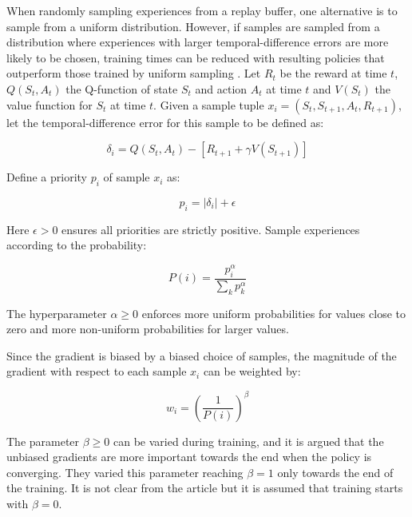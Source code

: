 When randomly sampling experiences from a replay buffer, one alternative is to
sample from a uniform distribution. However, if samples are sampled from a
distribution where experiences with larger temporal-difference errors are more
likely to be chosen, training times can be reduced with resulting policies that
outperform those trained by uniform sampling \cite{schaul2015prioritized}. Let
$R_{t}$ be the reward at time $t$, $Q(S_t, A_t)$ the Q-function of state $S_t$
and action $A_t$ at time $t$ and $V(S_t)$ the value function for $S_t$ at time
$t$. Given a sample tuple $x_i = (S_t, S_{t+1}, A_t, R_{t+1})$, let the
temporal-difference error for this sample to be defined as:

\begin{equation}
    \delta_i = Q(S_{t}, A_t) - \left[ R_{t+1} + \gamma V(S_{t+1}) \right]
\end{equation}

Define a priority $p_i$ of sample $x_i$ as:

\begin{equation}
    p_i = |\delta_i| + \epsilon
\end{equation}

Here $\epsilon > 0$ ensures all priorities are strictly positive. Sample experiences
according to the probability:

\begin{equation}
    P(i) = \frac{p_i^\alpha}{\sum_k p_k^\alpha}
\end{equation}

The hyperparameter $\alpha \geq 0$ enforces more uniform probabilities for values close to
zero and more non-uniform probabilities for larger values.

Since the gradient is biased by a biased choice of samples, the magnitude of
the gradient with respect to each sample $x_i$ can be weighted by:

\begin{equation}
    w_i = \left( \frac{1}{P(i)} \right)^\beta
\end{equation}

The parameter $\beta \geq 0$ can be varied during training, and it is argued that
the unbiased gradients are more important towards the end when the policy is
converging. They varied this parameter reaching $\beta = 1$ only towards the
end of the training. It is not clear from the article but it is assumed that
training starts with $\beta = 0$.


